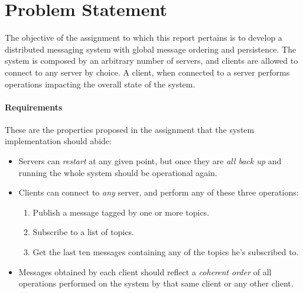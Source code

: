 
\section{Problem Statement}
\label{sec:problem}

The objective of the assignment to which this report pertains is to develop a distributed messaging system with global message ordering and persistence.
The system is composed by an arbitrary number of servers, and clients are allowed to connect to any server by choice. A client, when connected to a server performs operations impacting the overall state of the system. %


\paragraph{Requirements}

These are the properties proposed in the assignment that the system implementation should abide:

\begin{itemize}
    \item Servers can \emph{restart} at any given point, but once they are \emph{all back up} and running the whole system should be operational again.
    
    \item Clients can connect to \emph{any} server, and perform any of these three operations:
    \begin{enumerate}
        \item Publish a message tagged by one or more topics.
        \item Subscribe to a list of topics.
        \item Get the last ten messages containing any of the topics he's subscribed to.
    \end{enumerate}
    
    \item Messages obtained by each client should reflect a \emph{coherent order} of all operations performed on the system by that same client or any other client.
\end{itemize}



